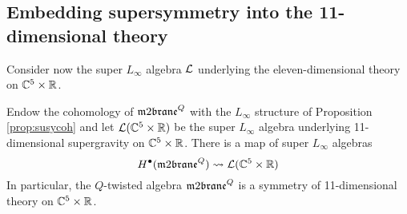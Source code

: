 \subsection{Embedding supersymmetry into the 11-dimensional theory} \label{s:residual}

Consider now the super $L_\infty$ algebra $\mathcal L$ underlying the eleven-dimensional theory on $\mathbb C^5 \times \mathbb R$. 

\begin{prop}
Endow the cohomology of $\m2^Q$ with the $L_\infty$ structure of Proposition \ref{prop:susycoh} and let $\mathcal L(\mathbb C^5 \times \mathbb R)$ be the super $L_\infty$ algebra underlying 11-dimensional supergravity on $\mathbb C^5 \times \mathbb R$. 
There is a map of super $L_\infty$ algebras 
\[
H^\bu(\m2^Q) \rightsquigarrow \cL (\CC^5 \times \RR)
\]
In particular, the $Q$-twisted algebra $\m2^Q$ is a symmetry of 11-dimensional theory on $\mathbb C^5 \times \mathbb R$. 
\end{prop}
